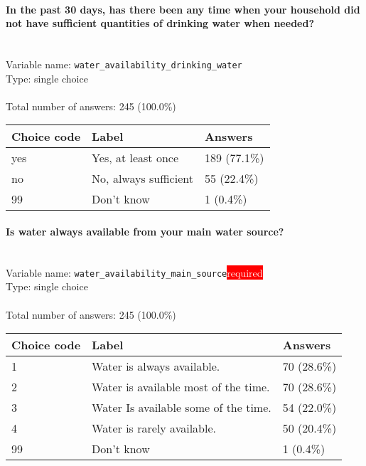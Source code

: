 \documentclass[11.5pt, a4paper]{scrartcl}
\begin{document}
\paragraph{In the past 30 days, has there been any time when your household did not have sufficient quantities of drinking water when needed? }
\  \\Variable name: \texttt{water\_availability\_drinking\_water}\\
Type: single choice\\
\\Total number of answers: 245 (100.0\%)
\\[0.2em] \begin{tabular}{p{4cm}|p{8cm}|p{3cm}}
Choice code & Label & Answers \\
\hline
yes & Yes, at least once& \cellcolor{color3}189 (77.1\%)\\
\cellcolor{mygray} no & \cellcolor{mygray}No, always sufficient & \cellcolor{color1}55 (22.4\%)\\
99 & Don’t know& \cellcolor{color0}1 (0.4\%)\\
\end{tabular}
\paragraph{Is water always available from your main water source?}
\  \\Variable name: \texttt{water\_availability\_main\_source}\hfill\colorbox{red}{\small{\textcolor{white}{required}}}\\
 Type: single choice\\
\\Total number of answers: 245 (100.0\%)
\\[0.2em] \begin{tabular}{p{4cm}|p{8cm}|p{3cm}}
Choice code & Label & Answers \\
\hline
1 & Water is always available.& \cellcolor{color1}70 (28.6\%)\\
\cellcolor{mygray} 2 & \cellcolor{mygray}Water is available most of the time. & \cellcolor{color1}70 (28.6\%)\\
3 & Water Is available some of the time.& \cellcolor{color1}54 (22.0\%)\\
\cellcolor{mygray} 4 & \cellcolor{mygray}Water is rarely available. & \cellcolor{color1}50 (20.4\%)\\
99 & Don’t know& \cellcolor{color0}1 (0.4\%)\\
\end{tabular}
\end{document}
